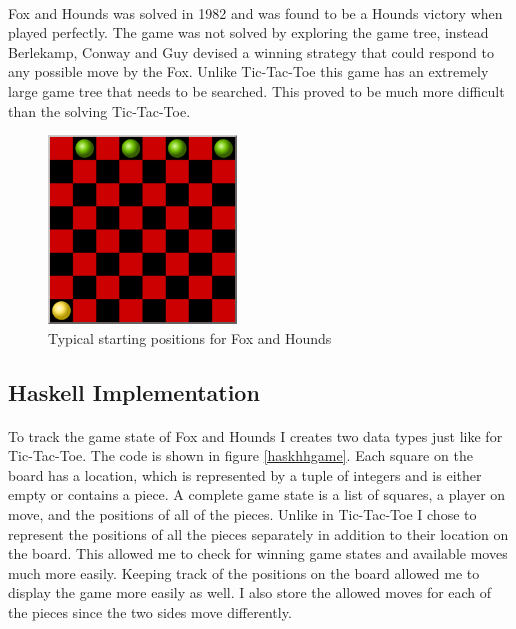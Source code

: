 \documentclass[10pt]{article}
\begin{document}
    \paragraph{} Fox and Hounds was solved in 1982 \cite{winningWays} and was 
    found to be a Hounds victory when played perfectly.  The game was not solved 
    by exploring the game tree, instead Berlekamp, Conway and Guy devised a 
    winning strategy that could respond to any possible move by the Fox.
    Unlike Tic-Tac-Toe this game has an extremely large game tree that
    needs to be searched.  This proved to be much more difficult than the 
    solving Tic-Tac-Toe.

    \begin{figure}[ht]
        \centering
        \includegraphics[width=5cm]{foxHounds.png}
        \caption{Typical starting positions for Fox and Hounds} \label{foxHoundspng}
    \end{figure}


\subsection{Haskell Implementation}
    \paragraph{} To track the game state of Fox and Hounds I creates two data types
    just like for Tic-Tac-Toe.  The code is shown in figure \ref{haskhhgame}.
    Each square on the board has a location, which is 
    represented by a tuple of integers and is either empty or contains a piece.
    A complete game state is a list of squares, a player on move, and the positions 
    of all of the pieces.  Unlike in Tic-Tac-Toe I chose to represent the positions 
    of all the pieces separately in addition to their location on the board.  This 
    allowed me to check for winning game states and available moves much 
    more easily.  Keeping track of the positions on the board allowed me to display
    the game more easily as well.  I also store the allowed moves for each of the 
    pieces since the two sides move differently.
\end{document}
